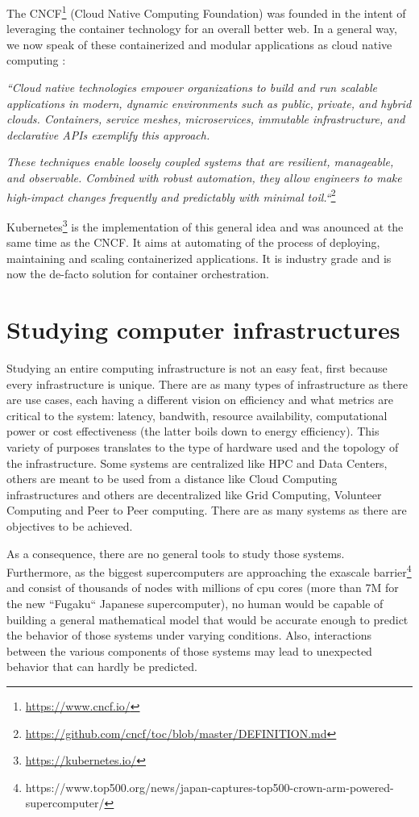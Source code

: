 \documentclass[12pt, a4paper]{memoir}
\begin{document}
The CNCF\footnote{\url{https://www.cncf.io/}} (Cloud Native Computing
Foundation) was founded in the intent of leveraging the container technology
for an overall better web. In a general way, we now speak of these
containerized and modular applications as cloud native computing :

\textit{``Cloud native technologies empower organizations to build and run
	scalable applications in modern, dynamic environments such as public,
	private, and hybrid clouds. Containers, service meshes, microservices,
	immutable infrastructure, and declarative APIs exemplify this
	approach.}

\textit{These techniques enable loosely coupled systems that
	are resilient, manageable, and observable.  Combined with robust
	automation, they allow engineers to make high-impact changes frequently
	and predictably with minimal toil.``}\footnote{\url{https://github.com/cncf/toc/blob/master/DEFINITION.md}}

Kubernetes\footnote{\url{https://kubernetes.io/}} is the implementation of this
general idea and was anounced at the same time as the CNCF. It aims at
automating of the process of deploying, maintaining and scaling containerized
applications. It is industry grade and is now the de-facto solution for
container orchestration.

\section{Studying computer infrastructures}

Studying an entire computing infrastructure is not an easy feat, first because
every infrastructure is unique. There are as many types of infrastructure as
there are use cases, each having a different vision on efficiency and what
metrics are critical to the system: latency, bandwith, resource availability,
computational power or cost effectiveness (the latter boils down to energy
efficiency). This variety of purposes translates to the type of hardware used
and the topology of the infrastructure. Some systems are centralized like HPC
and Data Centers, others are meant to be used from a distance like Cloud
Computing infrastructures and others are decentralized like Grid Computing,
Volunteer Computing and Peer to Peer computing. There are as many systems as
there are objectives to be achieved.

As a consequence, there are no general tools to study those systems.
Furthermore, as the biggest supercomputers are approaching the exascale
barrier\footnote{https://www.top500.org/news/japan-captures-top500-crown-arm-powered-supercomputer/}
and consist of thousands of nodes with millions of cpu cores (more than 7M for
the new ``Fugaku`` Japanese supercomputer), no human would be capable of
building a general mathematical model that would be accurate enough to predict
the behavior of those systems under varying conditions. Also, interactions
between the various components of those systems may lead to unexpected
behavior\cite{10.1007/978-3-319-09873-9_12} that can hardly be predicted.
\end{document}
